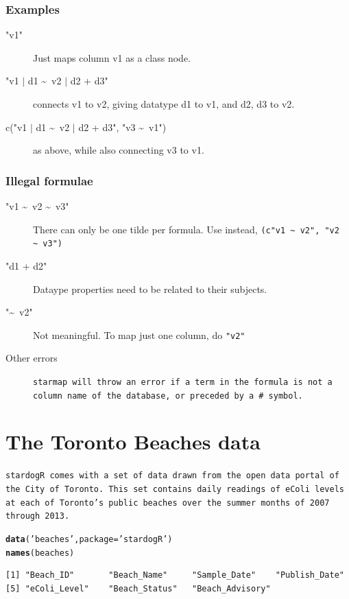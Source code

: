 \documentclass{article}\usepackage[]{graphicx}\usepackage[]{xcolor}
\makeatletter
\newcommand{\hlstr}[1]{\textcolor[rgb]{0.192,0.494,0.8}{#1}}%
\newcommand{\hlstd}[1]{\textcolor[rgb]{0.345,0.345,0.345}{#1}}%
\newcommand{\hlkwc}[1]{\textcolor[rgb]{0.333,0.667,0.333}{#1}}%
\newcommand{\hlkwd}[1]{\textcolor[rgb]{0.737,0.353,0.396}{\textbf{#1}}}%
\newenvironment{kframe}{%
 \def\at@end@of@kframe{}%
 \ifinner\ifhmode%
  \def\at@end@of@kframe{\end{minipage}}%
  \begin{minipage}{\columnwidth}%
 \fi\fi%
 \def\FrameCommand##1{\hskip\@totalleftmargin \hskip-\fboxsep
 \colorbox{shadecolor}{##1}\hskip-\fboxsep
     \hskip-\linewidth \hskip-\@totalleftmargin \hskip\columnwidth}%
 \MakeFramed {\advance\hsize-\width
   \@totalleftmargin\z@ \linewidth\hsize
   \@setminipage}}%
 {\par\unskip\endMakeFramed%
 \at@end@of@kframe}
\newenvironment{knitrout}{}{} %
\makeatother
\begin{document}
\subsubsection{Examples}

\begin{description}
  \item["v1"] Just maps column v1 as a class node.
  \item["v1 $\vert$ d1 \textasciitilde\ v2 $\vert$ d2 + d3"] connects v1 to v2, giving datatype d1 to v1, and d2, d3 to v2.
  \item[c("v1 $\vert$ d1 \textasciitilde\ v2 $\vert$ d2 + d3", "v3  \textasciitilde\ v1")] as above, while also connecting v3 to v1.
\end{description}

\subsubsection{Illegal formulae}

\begin{description}
  \item["v1 \textasciitilde\ v2 \textasciitilde\ v3"] There can only be one tilde per formula. Use instead, \tt(c{"v1 \textasciitilde\ v2", "v2 \textasciitilde\ v3"})
  \item["d1 + d2"] Dataype properties need to be related to their subjects.
  \item["\textasciitilde\ v2"] Not meaningful. To map just one column, do \tt{"v2"}
  \item[Other errors] \tt{starmap} will throw an error if a term in the formula is not a column name of the database, or preceded by a \# symbol.
\end{description}


\section{The Toronto Beaches data }

\tt{stardogR} comes with a set of data drawn from the open data portal of the City of Toronto. This set contains daily readings of eColi levels at each of Toronto's public beaches over the summer months of 2007 through 2013.

\begin{knitrout}
\color{fgcolor}\begin{kframe}
\begin{alltt}
\hlkwd{data}\hlstd{(}\hlstr{'beaches'}\hlstd{,} \hlkwc{package} \hlstd{=} \hlstr{'stardogR'}\hlstd{)}
\hlkwd{names}\hlstd{(beaches)}
\end{alltt}
\begin{verbatim}
[1] "Beach_ID"       "Beach_Name"     "Sample_Date"    "Publish_Date"  
[5] "eColi_Level"    "Beach_Status"   "Beach_Advisory"
\end{verbatim}
\end{kframe}
\end{knitrout}
\end{document}
